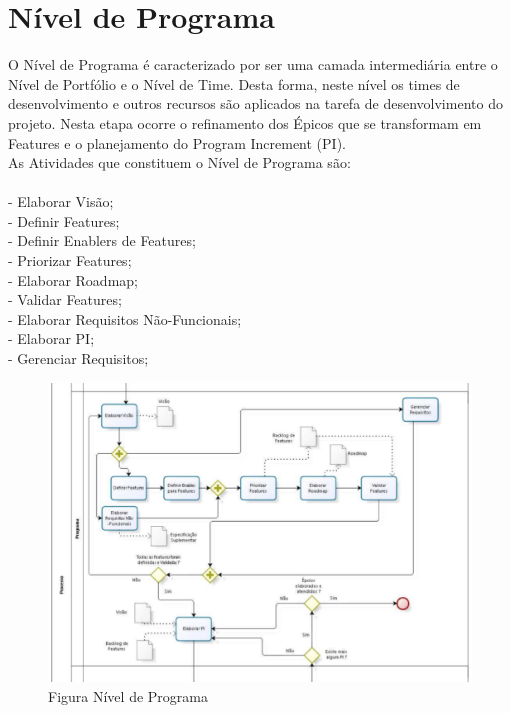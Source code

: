 \section{Nível de Programa}
O Nível de Programa é caracterizado por ser uma camada intermediária entre o Nível de Portfólio e o Nível de Time. Desta forma, neste nível os times de desenvolvimento e outros recursos são aplicados na tarefa de desenvolvimento do projeto.  Nesta etapa ocorre o refinamento dos Épicos que se transformam em Features e o planejamento do Program Increment (PI).\\
\tab As Atividades que constituem o Nível de Programa são:\\
\\
\tab - Elaborar Visão;\\
\tab - Definir Features;\\
\tab - Definir Enablers de Features;\\
\tab - Priorizar Features;\\
\tab - Elaborar Roadmap;\\
\tab - Validar Features;\\
\tab - Elaborar Requisitos Não-Funcionais;\\
\tab - Elaborar PI;\\
\tab - Gerenciar Requisitos;\\

\begin{figure}[h]
    \centering
    \label{fig01}
        \includegraphics[keepaspectratio=true,scale=0.5]{figuras/nivelProgramaRequisitos.eps}
    \caption{Figura Nível de Programa}
\end{figure}

